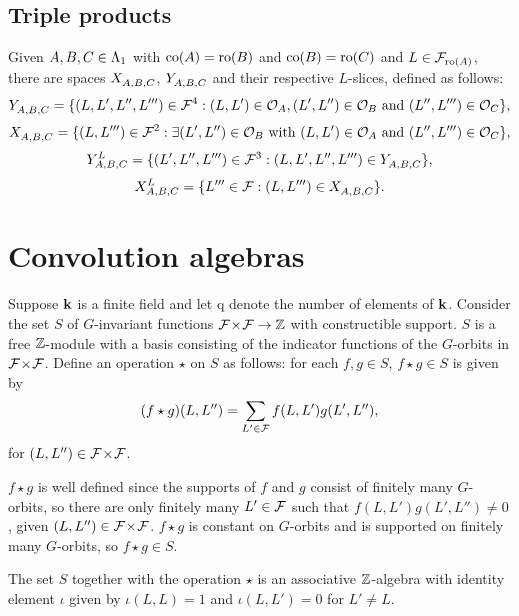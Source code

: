 \documentclass[a4paper, 11pt]{report}
\begin{document}
\subsection{Triple products}

Given $A,B,C\in\matrices$ with $\co{A}=\ro{B}$ and $\co{B}=\ro{C}$ and $L\in\flags_{\ro{A}}$, there are spaces $\xprod{A,B,C}$, $\yprod{A,B,C}$ and their respective $L$-slices, defined as follows:
\begin{equation*}
\yprod{A,B,C} = \{(L,L',L'',L''')\in\flags^4: (L,L')\in\orbit{A}, (L',L'')\in\orbit{B} \text{ and } (L'',L''')\in\orbit{C}\},
\end{equation*}
\begin{equation*}
\xprod{A,B,C} = \{(L,L''')\in\flags^2: \exists (L',L'')\in\orbit{B} \text{ with } (L,L')\in\orbit{A} \text{ and } (L'',L''')\in\orbit{C}\},
\end{equation*}
\begin{equation*}
\yprod[L]{A,B,C} = \{ (L',L'',L''')\in\flags^3: (L,L',L'',L''')\in\yprod{A,B,C}\},
\end{equation*}
\begin{equation*}
\xprod[L]{A,B,C} = \{ L'''\in\flags: (L,L''')\in\xprod{A,B,C}\}.
\end{equation*}

\section{Convolution algebras}

Suppose $\field$ is a finite field and let $\mathrm{q}$ denote the number of elements of $\field$. Consider the set $S$ of $G$-invariant functions $\dblflags\to\integers$ with constructible support. $S$ is a free $\integers$-module with a basis consisting of the indicator functions of the $G$-orbits in $\dblflags$. Define an operation $\star$ on $S$ as follows: for each $f,g\in S$, $f\star g\in S$ is given by
\begin{equation*}
(f\star g)(L,L'') = \sum_{L'\in\flags} f(L,L')g(L',L''),
\end{equation*}
for $(L,L'')\in\dblflags$. 

$f\star g$ is well defined since the supports of $f$ and $g$ consist of finitely many $G$-orbits, so there are only finitely many $L'\in\flags$ such that $f(L,L')g(L',L'')\neq 0$, given $(L,L'')\in\dblflags$. $f\star g$ is constant on $G$-orbits and is supported on finitely many $G$-orbits, so $f\star g\in S$.

\begin{lemma}\label{lemma:convolution-algebra}
The set $S$ together with the operation $\star$ is an associative $\integers$-algebra with identity element $\iota$ given by $\iota(L,L) = 1$ and $\iota(L,L')=0$ for $L'\neq L$.
\end{lemma}
\end{document}
